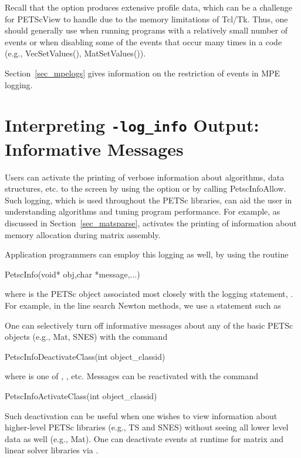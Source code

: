 {{Recall that the option  produces extensive profile
data, which can be a challenge for PETScView to handle due to
the memory limitations of Tcl/Tk.  Thus, one should generally use
 when running programs with a relatively small
number of events or when disabling some of the events that occur many
times in a code (e.g., VecSetValues(), MatSetValues()).

Section~\ref{sec_mpelogs} gives information on the restriction of events
in MPE logging.


\section{Interpreting {\tt -log\_info} Output: Informative Messages}
\label{sec_PetscLoginfo}

Users can activate the printing of verbose information about
algorithms, data structures, etc. to the screen by using the option   or by calling PetscInfoAllow. 
Such logging, which is used throughout the PETSc libraries,
can aid the user in understanding algorithms and 
tuning program performance.  For example, as discussed in
Section~\ref{sec_matsparse},  activates the
printing of information about memory allocation during
matrix assembly.

Application programmers can employ this logging as well, by
using the routine 
\begin{tabbing}
   PetscInfo(void* obj,char *message,...)
\end{tabbing}
where  is the PETSc object associated most closely with
the logging statement, .
For example, in the line search Newton methods, we use a statement such as

One can selectively turn off informative messages about any of the 
basic PETSc objects (e.g., Mat, SNES) with the command
\begin{tabbing}
   PetscInfoDeactivateClass(int object\_classid)
\end{tabbing}
where 
 is one of , , etc.
Messages can be reactivated with the command
\begin{tabbing}
   PetscInfoActivateClass(int object\_classid)
\end{tabbing}
Such deactivation can be useful when one wishes to view information
about higher-level PETSc libraries (e.g., TS and SNES) without 
seeing all lower level data as well (e.g., Mat).  One can deactivate
events at runtime for matrix and linear solver libraries via .

}}
